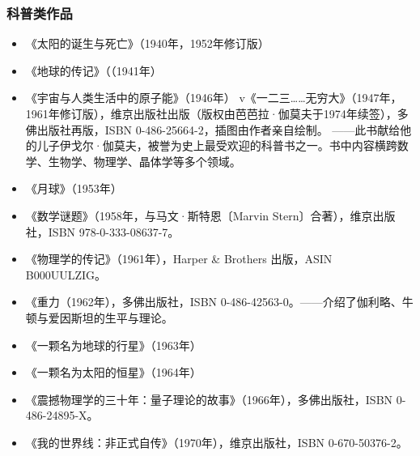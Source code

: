 \subsubsection{科普类作品}
\begin{itemize}
\item 《太阳的诞生与死亡》（1940年，1952年修订版）
\item 《地球的传记》（（1941年）
\item 《宇宙与人类生活中的原子能》（1946年）
v《一二三……无穷大》（1947年，1961年修订版），维京出版社出版（版权由芭芭拉·伽莫夫于1974年续签），多佛出版社再版，ISBN 0-486-25664-2，插图由作者亲自绘制。
  ——此书献给他的儿子伊戈尔·伽莫夫，被誉为史上最受欢迎的科普书之一。书中内容横跨数学、生物学、物理学、晶体学等多个领域。
\item 《月球》（1953年）
\item 《数学谜题》（1958年，与马文·斯特恩〔Marvin Stern〕合著），维京出版社，ISBN 978-0-333-08637-7。
\item 《物理学的传记》（1961年），Harper & Brothers 出版，ASIN B000UULZIG。
\item 《重力（1962年），多佛出版社，ISBN 0-486-42563-0。——介绍了伽利略、牛顿与爱因斯坦的生平与理论。
\item 《一颗名为地球的行星》（1963年）
\item 《一颗名为太阳的恒星》（1964年）
\item 《震撼物理学的三十年：量子理论的故事》（1966年），多佛出版社，ISBN 0-486-24895-X。
\item 《我的世界线：非正式自传》（1970年），维京出版社，ISBN 0-670-50376-2。
\end{itemize}
